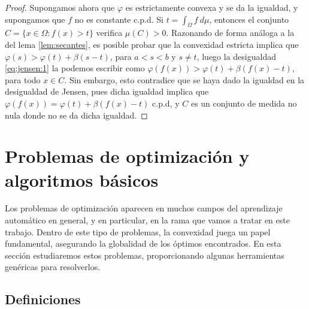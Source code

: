 \begin{proof}
    Supongamos ahora que $\varphi$ es estrictamente convexa y se da la igualdad, y supongamos que $f$ no es constante c.p.d. Si $t = \int_{\Omega} f \ d\mu$, entonces el conjunto $C = \{x \in \Omega \colon f(x) > t\}$ verifica $\mu(C) > 0$. Razonando de forma análoga a la del lema \ref{lem:secantes}, es posible probar que la convexidad estricta implica que $\varphi(s) > \varphi(t) + \beta(s-t)$, para $a < s < b$ y $s \ne t$, luego la desigualdad \ref{eq:jensen:1} la podemos escribir como $\varphi(f(x)) > \varphi(t) + \beta(f(x) - t)$, para todo $x \in C$. Sin embargo, esto contradice que se haya dado la igualdad en la desigualdad de Jensen, pues dicha igualdad implica que $\varphi(f(x)) = \varphi(t) + \beta(f(x)-t)$ c.p.d, y $C$ es un conjunto de medida no nula donde no se da dicha igualdad.
\end{proof}

\section{Problemas de optimización y algoritmos básicos}

Los problemas de optimización aparecen en muchos campos del aprendizaje automático en general, y en particular, en la rama que vamos a tratar en este trabajo. Dentro de este tipo de problemas, la convexidad juega un papel fundamental, asegurando la globalidad de los óptimos encontrados. En esta sección estudiaremos estos problemas, proporcionando algunas herramientas genéricas para resolverlos.

\subsection{Definiciones}

